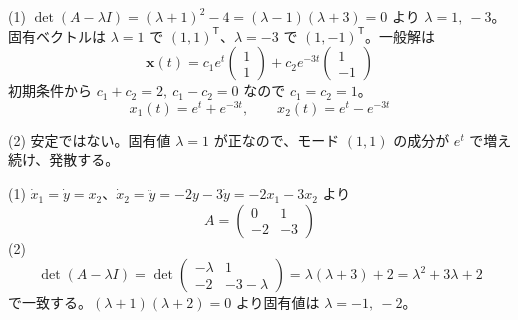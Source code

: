 \documentclass[11pt]{article}
\begin{document}
\problem
\begin{ans}
(1) $\det(A-\lambda I) = (\lambda+1)^2 - 4 = (\lambda-1)(\lambda+3)=0$ より $\lambda = 1,\ -3$。
固有ベクトルは $\lambda=1$ で $(1,1)^{\mathsf T}$、$\lambda=-3$ で $(1,-1)^{\mathsf T}$。一般解は
\[ \boldsymbol x(t) = c_1 e^{t}\begin{pmatrix}1\\1\end{pmatrix} + c_2 e^{-3t}\begin{pmatrix}1\\-1\end{pmatrix} \]
初期条件から $c_1+c_2=2,\ c_1-c_2=0$ なので $c_1=c_2=1$。
\[ x_1(t) = e^{t} + e^{-3t},\qquad x_2(t) = e^{t} - e^{-3t} \]

(2) 安定ではない。固有値 $\lambda = 1$ が正なので、モード $(1,1)$ の成分が $e^{t}$ で増え続け、発散する。
\end{ans}

\problem
\begin{ans}
(1) $\dot x_1 = \dot y = x_2$、$\dot x_2 = \ddot y = -2y - 3\dot y = -2x_1 - 3x_2$ より
\[ A = \begin{pmatrix} 0 & 1 \\ -2 & -3 \end{pmatrix} \]
(2)
\[ \det(A-\lambda I) = \det\begin{pmatrix}-\lambda & 1\\ -2 & -3-\lambda\end{pmatrix} = \lambda(\lambda+3) + 2 = \lambda^2 + 3\lambda + 2 \]
で一致する。$(\lambda+1)(\lambda+2)=0$ より固有値は $\lambda = -1,\ -2$。
\end{ans}
\end{document}
